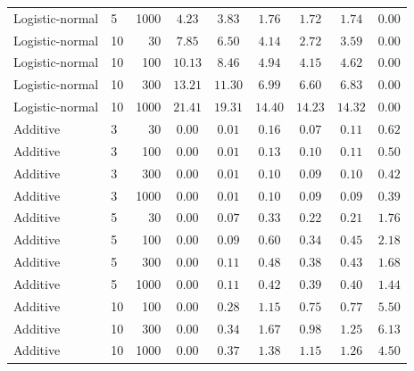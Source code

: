 \begin{tabular}{llrcccccc}
Logistic-normal & 5 & 1000 & $4.23$ & $3.83$ & $1.76$ & $1.72$ & $1.74$ & $\mathbf{0.00}$\\
Logistic-normal & 10 & 30 & $7.85$ & $6.50$ & $4.14$ & $2.72$ & $3.59$ & $\mathbf{0.00}$\\
Logistic-normal & 10 & 100 & $10.13$ & $8.46$ & $4.94$ & $4.15$ & $4.62$ & $\mathbf{0.00}$\\
Logistic-normal & 10 & 300 & $13.21$ & $11.30$ & $6.99$ & $6.60$ & $6.83$ & $\mathbf{0.00}$\\
Logistic-normal & 10 & 1000 & $21.41$ & $19.31$ & $14.40$ & $14.23$ & $14.32$ & $\mathbf{0.00}$\\
Additive & 3 & 30 & $\mathbf{0.00}$ & $\mathbf{0.01}$ & $0.16$ & $0.07$ & $0.11$ & $0.62$\\
Additive & 3 & 100 & $\mathbf{0.00}$ & $\mathbf{0.01}$ & $0.13$ & $0.10$ & $0.11$ & $0.50$\\
Additive & 3 & 300 & $\mathbf{0.00}$ & $\mathbf{0.01}$ & $0.10$ & $0.09$ & $0.10$ & $0.42$\\
Additive & 3 & 1000 & $\mathbf{0.00}$ & $\mathbf{0.01}$ & $0.10$ & $0.09$ & $0.09$ & $0.39$\\
Additive & 5 & 30 & $\mathbf{0.00}$ & $0.07$ & $0.33$ & $0.22$ & $0.21$ & $1.76$\\
Additive & 5 & 100 & $\mathbf{0.00}$ & $0.09$ & $0.60$ & $0.34$ & $0.45$ & $2.18$\\
Additive & 5 & 300 & $\mathbf{0.00}$ & $0.11$ & $0.48$ & $0.38$ & $0.43$ & $1.68$\\
Additive & 5 & 1000 & $\mathbf{0.00}$ & $0.11$ & $0.42$ & $0.39$ & $0.40$ & $1.44$\\
Additive & 10 & 100 & $\mathbf{0.00}$ & $0.28$ & $1.15$ & $0.75$ & $0.77$ & $5.50$\\
Additive & 10 & 300 & $\mathbf{0.00}$ & $0.34$ & $1.67$ & $0.98$ & $1.25$ & $6.13$\\
Additive & 10 & 1000 & $\mathbf{0.00}$ & $0.37$ & $1.38$ & $1.15$ & $1.26$ & $4.50$\\
\bottomrule\end{tabular}
